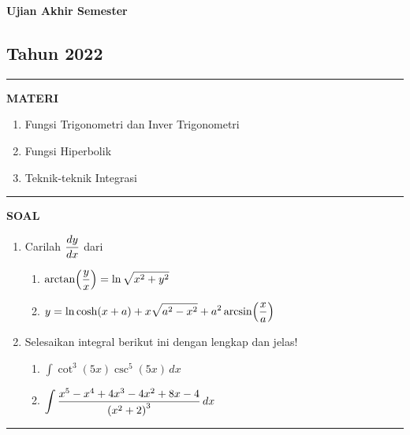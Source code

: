 \begin{flushright}
    \textbf{\Large{Ujian Akhir Semester}}
    \subsection*{Tahun 2022}
\end{flushright}


\vspace{0.5cm}\hrule height 2pt\vspace{0.5cm}


\begin{center}
\textbf{\large{MATERI}}
\begin{enumerate}[leftmargin=*, label={\arabic*}.]
\item Fungsi Trigonometri dan Inver Trigonometri
\item Fungsi Hiperbolik
\item Teknik-teknik Integrasi
\end{enumerate}
\end{center}


\vspace{0.2cm}\hrule height 1pt\vspace{0.5cm}


\begin{center}
\textbf{\large{SOAL}}
\end{center}
\begin{enumerate}[leftmargin=*, label={\arabic*}.]
\item Carilah $\ds \frac{dy}{dx}$ dari 
    \begin{enumerate}[label={\alph*}.]
    \item $\ds \arctan\brk*{\frac{y}{x}}=\ln\sqrt{x^{2}+y^{2}}$
    \item $\ds y=\ln \cosh (x+a)+x\sqrt{a^{2}-x^{2}}+a^{2}\arcsin\brk*{\frac{x}{a}}$
    \end{enumerate}
\item Selesaikan integral berikut ini dengan lengkap dan jelas!
    \begin{enumerate}[label={\alph*}.]
    \item $\int \cot^{3}(5x)\csc^{5}(5x)\,dx$  
    \item $\ds \int \frac{x^{5}-x^{4}+4x^{3}-4x^{2}+8x-4}{\brk*{x^{2}+2}^{3}}\,dx$
    \end{enumerate}
\end{enumerate}


\vspace{0.2cm}\hrule height 1pt\vspace{0.5cm}


